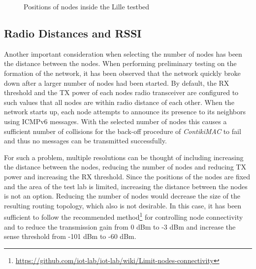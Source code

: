 \begin{figure}
  \caption{Positions of nodes inside the Lille testbed}
  \label{fig:testbed}
\end{figure}

\subsection{Radio Distances and RSSI}
\label{subsec:rssi}

Another important consideration when selecting the number of nodes has been the
distance between the nodes. When performing preliminary testing on the formation
of the network, it has been observed that the network quickly broke down after a
larger number of nodes had been started. By default, the \ac{RX} threshold and
the \ac{TX} power of each nodes radio transceiver are configured to such values
that all nodes are within radio distance of each other. When the network starts
up, each node attempts to announce its presence to its neighbors using
\ac{ICMPv6} messages. With the selected number of nodes this causes a sufficient
number of collisions for the back-off procedure of \emph{ContikiMAC} to fail and
thus no messages can be transmitted successfully.

For such a problem, multiple resolutions can be thought of including increasing
the distance between the nodes, reducing the number of nodes and reducing
\ac{TX} power and increasing the \ac{RX} threshold. Since the positions
of the nodes are fixed and the area of the test lab is limited, increasing the
distance between the nodes is not an option. Reducing the number of nodes would
decrease the size of the resulting routing topology, which also is not
desirable. In this case, it has been sufficient to follow the recommended
method\footnote{\url{https://github.com/iot-lab/iot-lab/wiki/Limit-nodes-connectivity}}
for controlling node connectivity and to reduce the transmission gain from 0 dBm
to -3 dBm and increase the sense threshold from -101 dBm to -60 dBm.

